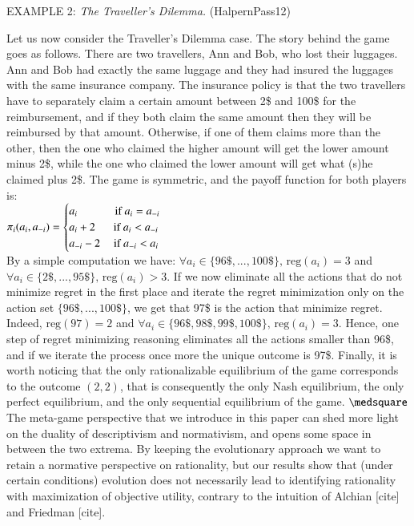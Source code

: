 \documentclass[fleqn,reqno,11pt]{article}
\begin{document}
\vspace{.5cm}

EXAMPLE 2: \textit{The Traveller's Dilemma.} (HalpernPass12)

Let us now consider the Traveller's Dilemma case. The story behind the game goes as follows. There are two travellers, Ann and Bob, who lost their luggages. Ann and Bob had exactly the same luggage and they had insured the luggages with the same insurance company. The insurance policy is that the two travellers have to separately claim a certain amount between 2\$ and 100\$ for the reimbursement, and if they both claim the same amount then they will be reimbursed by that amount. Otherwise, if one of them claims more than the other, then the one who claimed the higher amount will get the lower amount minus 2\$, while the one who claimed the lower amount will get what (s)he claimed plus 2\$. The game is symmetric, and the payoff function for both players is:\\
$\pi_i(a_i,a_{-i}) =  \begin{cases} a_i \text{ \hspace{1cm} if } a_i = a_{-i} \\ a_i + 2 \text{ \hspace{.4cm} if } a_i < a_{-i} \\ a_{-i} -2 \text{ \hspace{.25cm} if } a_{-i} < a_i \end{cases}$ \\
By a simple computation we have:  $\forall a_i \in \lbrace 96\$, ..., 100\$ \rbrace \text{, } \text{reg}(a_i)=3 $ and $\forall a_i \in \lbrace 2\$, ..., 95\$ \rbrace \text{, } \text{reg}(a_i)>3$. If we now eliminate all the actions that do not minimize regret in the first place and iterate the regret minimization only on the action set $\lbrace 96\$, ..., 100\$ \rbrace$, we get that 97\$ is the action that minimize regret. Indeed, $\text{reg}(97)=2$ and $\forall a_i \in \lbrace 96\$, 98\$, 99\$, 100\$ \rbrace \text{, } \text{reg}(a_i)=3 $. Hence, one step of regret minimizing reasoning eliminates all the actions smaller than 96\$, and if we iterate the process once more the unique outcome is 97\$. Finally, it is worth noticing that the only rationalizable equilibrium of the game corresponds to the outcome $(2,2)$, that is consequently the only Nash equilibrium, the only perfect equilibrium, and the only sequential equilibrium of the game. $ \medsquare $\\ 


The meta-game perspective that we introduce in this paper can shed more light on the duality of descriptivism and normativism, and opens
some space in between the two extrema. 
By keeping the evolutionary approach we want to retain a
normative perspective on rationality, but our results show that (under certain conditions)
evolution does not necessarily lead to identifying rationality with maximization of objective
utility, contrary to the intuition of Alchian [cite] and Friedman [cite].
\end{document}
